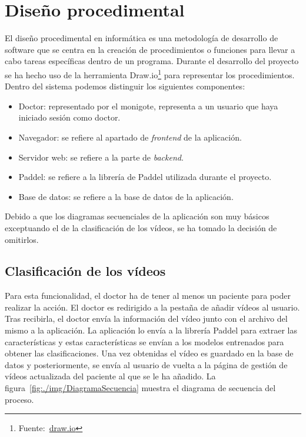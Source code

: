 \section{Diseño procedimental}
El diseño procedimental en informática es una metodología de desarrollo de software que se centra en la creación de procedimientos o funciones para llevar a cabo tareas específicas dentro de un programa.
Durante el desarrollo del proyecto se ha hecho uso de la herramienta Draw.io\footnote{Fuente:~\url{draw.io}} para representar los procedimientos. Dentro del sistema podemos distinguir los siguientes componentes:
\begin{itemize}
\item Doctor: representado por el monigote, representa a un usuario que haya iniciado sesión como doctor.
\item Navegador: se refiere al apartado de \textit{frontend} de la aplicación.
\item Servidor web: se refiere a la parte de \textit{backend}.
\item Paddel: se refiere a la librería de Paddel utilizada durante el proyecto.
\item Base de datos: se refiere a la base de datos de la aplicación.
\end{itemize}

Debido a que los diagramas secuenciales de la aplicación son muy básicos exceptuando el de la clasificación de los vídeos, se ha tomado la decisión de omitirlos.

\subsection{Clasificación de los vídeos}
Para esta funcionalidad, el doctor ha de tener al menos un paciente para poder realizar la acción. El doctor es redirigido a la pestaña de añadir vídeos al usuario. Tras recibirla, el doctor envía la información del vídeo junto con el archivo del mismo a la aplicación. La aplicación lo envía a la librería Paddel para extraer las características y estas características se envían a los modelos entrenados para obtener las clasificaciones. Una vez obtenidas el vídeo es guardado en la base de datos y posteriormente, se envía al usuario de vuelta a la página de gestión de vídeos actualizada del paciente al que se le ha añadido.
La figura~\ref{fig:./img/DiagramaSecuencia} muestra el diagrama de secuencia del proceso.


